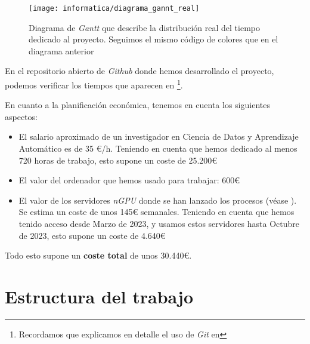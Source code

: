 \begin{figure}[H]
    \centering
    \texttt{[image: informatica/diagrama\_gannt\_real]}
    \caption{Diagrama de \textit{Gantt} que describe la distribución real del tiempo dedicado al proyecto. Seguimos el mismo código de colores que en el diagrama anterior}
    \label{img:gannt_real}
\end{figure}

En el repositorio abierto de \textit{Github} \cite{informatica:repogithub} donde hemos desarrollado el proyecto, podemos verificar los tiempos que aparecen en  \footnote{Recordamos que explicamos en detalle el uso de \textit{Git} en }.

En cuanto a la planificación económica, tenemos en cuenta los siguientes aspectos:

\begin{itemize}
    \item El salario aproximado de un investigador en Ciencia de Datos y Aprendizaje Automático es de 35 €/h. Teniendo en cuenta que hemos dedicado al menos 720 horas de trabajo, esto supone un coste de 25.200€
    \item El valor del ordenador que hemos usado para trabajar: 600€
    \item El valor de los servidores \textit{nGPU} donde se han lanzado los procesos (véase ). Se estima un coste de unos 145€ semanales. Teniendo en cuenta que hemos tenido acceso desde Marzo de 2023, y usamos estos servidores hasta Octubre de 2023, esto supone un coste de 4.640€
\end{itemize}

Todo esto supone un \textbf{coste total} de unos 30.440€.

\section{Estructura del trabajo}
